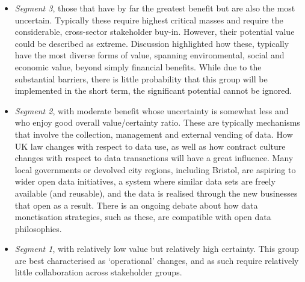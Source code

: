 \documentclass[journal]{IEEEtran}
\begin{document}
\begin{itemize}
\item {\emph{Segment 3}}, those that have by far the greatest benefit but are
  also the most uncertain. Typically these require highest critical
  masses and require the considerable, cross-sector stakeholder
  buy-in. However, their potential value could be described as
  extreme. Discussion highlighted how these, typically have the most
  diverse forms of value, spanning environmental, social and economic
  value, beyond simply financial benefits. While due to the
  substantial barriers, there is little probability that this group
  will be implemented in the short term, the significant potential
  cannot be ignored.
\item {\emph{Segment 2}}, with moderate benefit whose uncertainty is somewhat
  less and who enjoy good overall value/certainty ratio. These are
  typically mechanisms that involve the collection, management and
  external vending of data. How UK law changes with respect to data
  use, as well as how contract culture changes with respect to data
  transactions will have a great influence. Many local governments or
  devolved city regions, including Bristol, are aspiring to wider open
  data initiatives, a system where similar data sets are freely
  available (and reusable), and the data is realised through the new
  businesses that open as a result. There is an ongoing debate about
  how data monetisation strategies, such as these, are compatible with
  open data philosophies.
\item {\emph{Segment 1}}, with relatively low value but relatively high
  certainty. This group are best characterised as `operational'
  changes, and as such require relatively little collaboration across
  stakeholder groups. 
\end{itemize}
\end{document}
